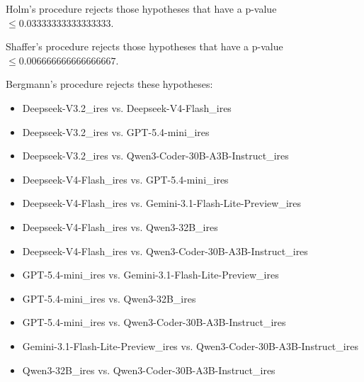 \documentclass[a4paper,10pt]{article}
\begin{document}
\begin{landscape}
Holm's procedure rejects those hypotheses that have a p-value $\le0.03333333333333333$.


Shaffer's procedure rejects those hypotheses that have a p-value $\le0.006666666666666667$.


Bergmann's procedure rejects these hypotheses:


\begin{itemize}


\item Deepseek-V3.2_ires vs. Deepseek-V4-Flash_ires
\item Deepseek-V3.2_ires vs. GPT-5.4-mini_ires
\item Deepseek-V3.2_ires vs. Qwen3-Coder-30B-A3B-Instruct_ires
\item Deepseek-V4-Flash_ires vs. GPT-5.4-mini_ires
\item Deepseek-V4-Flash_ires vs. Gemini-3.1-Flash-Lite-Preview_ires
\item Deepseek-V4-Flash_ires vs. Qwen3-32B_ires
\item Deepseek-V4-Flash_ires vs. Qwen3-Coder-30B-A3B-Instruct_ires
\item GPT-5.4-mini_ires vs. Gemini-3.1-Flash-Lite-Preview_ires
\item GPT-5.4-mini_ires vs. Qwen3-32B_ires
\item GPT-5.4-mini_ires vs. Qwen3-Coder-30B-A3B-Instruct_ires
\item Gemini-3.1-Flash-Lite-Preview_ires vs. Qwen3-Coder-30B-A3B-Instruct_ires
\item Qwen3-32B_ires vs. Qwen3-Coder-30B-A3B-Instruct_ires
\end{itemize}



\end{landscape}
\end{document}
